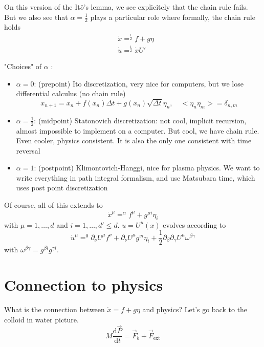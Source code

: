 \documentclass[a4paper]{book}
\theoremstyle{definition}
\theoremstyle{remark}
\begin{document}
On this version of the It$\bar{o}$'s lemma, we see explicitely that the chain rule fails. But we also see that $\alpha = \frac{1}{2}$ plays a particular role where formally, the chain rule holds 
\begin{equation}
    \begin{aligned}
        &\dot{x} =^{\frac{1}{2}} f + g\eta \\ 
        &\dot{u} =^{\frac{1}{2}} \dot{x}U'
    \end{aligned}
\end{equation}

"Choices" of $\alpha$ : 
\begin{itemize}
    \item $\alpha = 0$: (prepoint) Ito discretization, very nice for computers, but we lose differential calculus (no chain rule)
    \begin{equation}
        x_{n+1} = x_n + f(x_n)\Delta t + g(x_n)\sqrt{\Delta t}\eta_n, \quad <\eta_n\eta_m> = \delta_{n,m}
    \end{equation}
    \item $\alpha = \frac{1}{2}$: (midpoint) Statonovich discretization: not cool, implicit recursion, almost impossible to implement on a computer. But cool, we have chain rule. Even cooler, physics consistent. It is also the only one consistent with time reversal
    \item $\alpha = 1$: (postpoint) Klimontovich-Hanggi, nice for plasma physics. We want to write everything in path integral formalism, and use Matsubara time, which uses post point discretization
\end{itemize}

Of course, all of this extends to 
\begin{equation}
    \dot{x}^\mu =^\alpha f^\mu + g^{\mu i}\eta_i
\end{equation}
with $\mu = 1,\dots, d$ and $i = 1, \dots, d' \leq d$. $u = U^\mu(x)$ evolves according to 
\begin{equation}
    \dot{u}^\mu =^0 \partial_\nu U^\mu f^\nu + \partial_\nu U^\mu g^{\nu i}\eta_i + \frac{1}{2}\partial_\beta \partial_\gamma U^\mu \omega^{\beta\gamma}
\end{equation}
with $\omega^{\beta\gamma} = g^{\beta i}g^{\gamma i}$. 

\section{Connection to physics}
What is the connection between $\dot{x} = f + g\eta$ and physics? Let's go back to the colloid in water picture. 
\begin{equation}
    M\frac{\text{d}\vec{P}}{\text{d}t} = \vec{F}_b + \vec{F}_{\text{ext}}
\end{equation}
\end{document}
